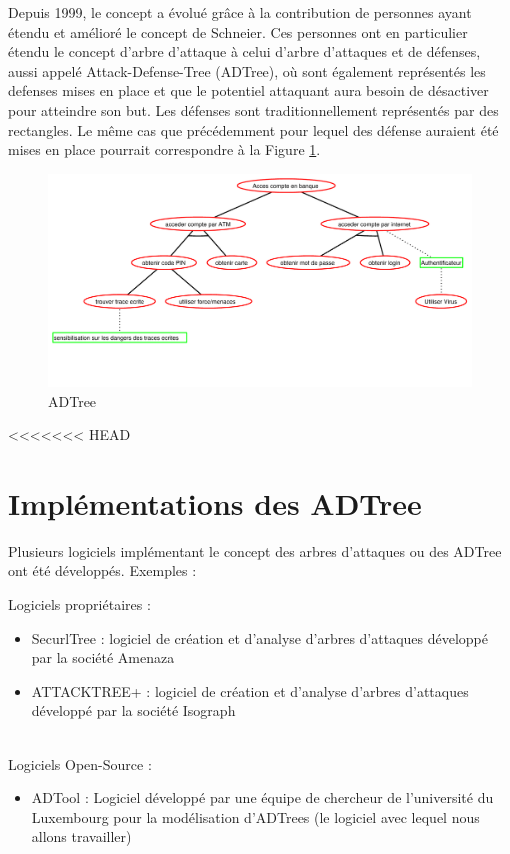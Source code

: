 		Depuis 1999, le concept a évolué grâce à la contribution de personnes ayant étendu et amélioré le concept de Schneier. Ces personnes ont en particulier étendu le concept d'arbre d'attaque à celui d'arbre d'attaques et de défenses, aussi appelé Attack-Defense-Tree (ADTree), où sont également représentés les defenses mises en place et que le potentiel attaquant aura besoin de désactiver pour atteindre son but. Les défenses sont traditionnellement représentés par des rectangles. Le même cas que précédemment pour lequel des défense auraient été mises en place pourrait correspondre à la Figure \ref{fig:arbre_exemple_2}.

        \begin{figure}[h!]
            \begin{center}
                \includegraphics[width=1\textwidth]{figure/exemple2_rapport.pdf}
            \end{center}
            \caption{ADTree}
            \label{fig:arbre_exemple_2}
        \end{figure}

<<<<<<< HEAD
	\section{Implémentations des ADTree}
		Plusieurs logiciels implémentant le concept des arbres d'attaques ou des ADTree ont été développés. Exemples :
        
        {\large Logiciels propriétaires :}
        \begin{itemize}
            \item SecurlTree : logiciel de création et d'analyse d'arbres d'attaques développé par la société Amenaza
            \item ATTACKTREE+ : logiciel de création et d'analyse d'arbres d'attaques développé par la société Isograph
        \end{itemize}
        ~~\\
        {\large Logiciels Open-Source :}
        \begin{itemize}
            \item ADTool : Logiciel développé par une équipe de chercheur de l'université du Luxembourg pour la modélisation d'ADTrees (le logiciel avec lequel nous allons travailler)
        \end{itemize}
~~

